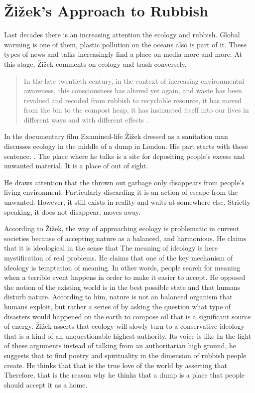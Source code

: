 \section{Žižek’s Approach to Rubbish}
Last decades there is an increasing attention the ecology and rubbish. Global warming is one of them, plastic pollution on the oceans also is part of it. These types of news and talks increasingly find a place on media more and more. At this stage, Žižek comments on ecology and trash conversely.

\begin{quote}
In the late twentieth century, in the context of increasing environmental awareness, this consciousness has altered yet again, and waste has been revalued and recoded from rubbish to recyclable resource, it has moved from the bin to the compost heap, it has insinuated itself into our lives in different ways and with different effects \citep[5]{hawkins2005ethics}.
\end{quote}

In the documentary film Examined-life Žižek dressed as a sanitation man discusses ecology in the middle of a dump in London. His part starts with these sentence: . The place where he talks is a site for depositing people’s excess and unwanted material. It is a place of out of sight.

He draws attention that the thrown out garbage only disappears from people’s living environment. Particularly discarding it is an action of escape from the unwanted. However, it still exists in reality and waits at somewhere else. Strictly speaking, it does not disappear, moves away.

According to Žižek, the way of approaching ecology is problematic in current societies because of accepting nature as a balanced, and harmonious. He claims that it is ideological in the sense that  The meaning of ideology is here mystification of real problems. He claims that one of the key mechanism of ideology is temptation of meaning. In other words, people search for meaning when a terrible event happens in order to make it easier to accept. He opposed the notion of the existing world is in the best possible state and that humans disturb nature. According to him, nature is not an balanced organism that humans exploit, but rather a series of  by asking the question what type of disasters would happened on the earth to compose oil that is a significant source of energy. Žižek asserts that ecology will slowly turn to a conservative ideology that is a kind of an unquestionable highest authority. Its voice is like  In the light of these arguments instead of talking from an authoritarian high ground, he suggests that to find poetry and spirituality in the dimension of rubbish people create. He thinks that that is the true love of the world by asserting that  Therefore, that is the reason why he thinks that a dump is a place that people should accept it as a home. 


